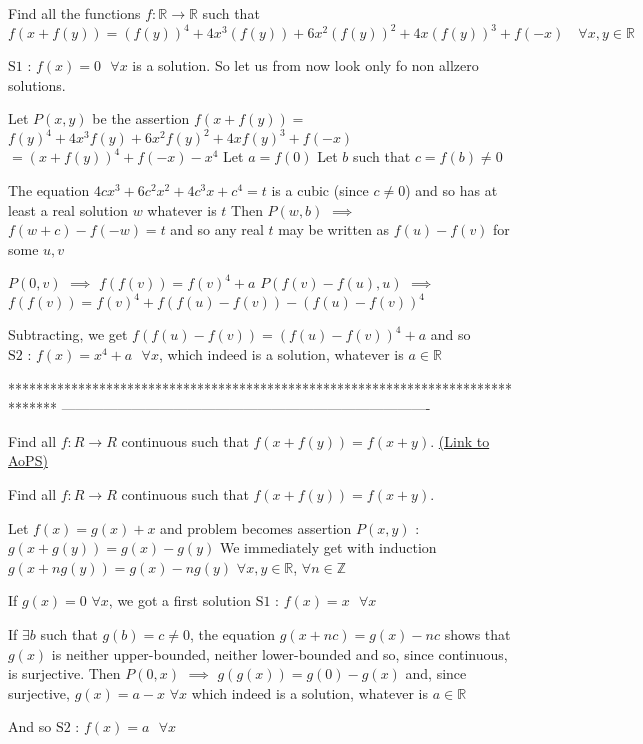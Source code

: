 \begin{solution}
	\begin{tcolorbox}Find all the functions $f:\mathbb{R}\to\mathbb{R}$ such that 
\[f(x+f(y))=(f(y))^4+4x^3(f(y))+6x^2(f(y))^2+4x(f(y))^3+f(-x) \quad \forall x,y \in\mathbb R\]\end{tcolorbox}
$\boxed{\text{S1 : }f(x)=0\text{  }\forall x}$ is a solution. So let us from now look only fo non allzero solutions.

Let $P(x,y)$ be the assertion $f(x+f(y))=$ $f(y)^4+4x^3f(y)+6x^2f(y)^2+4xf(y)^3+f(-x)$ $=(x+f(y))^4+f(-x)-x^4$
Let $a=f(0)$
Let $b$ such that $c=f(b)\ne 0$

The equation $4cx^3+6c^2x^2+4c^3x+c^4=t$ is a cubic (since $c\ne 0$) and so has at least a real solution $w$ whatever is $t$
Then $P(w,b)$ $\implies$ $f(w+c)-f(-w)=t$ and so any real $t$ may be written as $f(u)-f(v)$ for some $u,v$

$P(0,v)$ $\implies$ $f(f(v))=f(v)^4+a$
$P(f(v)-f(u),u)$ $\implies$ $f(f(v))=f(v)^4+f(f(u)-f(v))-(f(u)-f(v))^4$

Subtracting, we get $f(f(u)-f(v))=(f(u)-f(v))^4+a$ and so $\boxed{\text{S2 : }f(x)=x^4+a\text{   }\forall x}$, which indeed is a solution, whatever is $a\in\mathbb R$
\end{solution}
*******************************************************************************
-------------------------------------------------------------------------------

\begin{problem}
	Find all $f:R \rightarrow R$  continuous such that
$f(x+f(y))=f(x+y).$
	\flushright \href{https://artofproblemsolving.com/community/c6h586978}{(Link to AoPS)}
\end{problem}



\begin{solution}
	\begin{tcolorbox}Find all $f:R \rightarrow R$  continuous such that
$f(x+f(y))=f(x+y).$\end{tcolorbox}
Let $f(x)=g(x)+x$ and problem becomes assertion $P(x,y)$ : $g(x+g(y))=g(x)-g(y)$
We immediately get with induction $g(x+ng(y))=g(x)-ng(y)$ $\forall x,y\in\mathbb R$, $\forall n\in\mathbb Z$

If $g(x)=0$ $\forall x$, we got a first solution $\boxed{\text{S1 : }f(x)=x\text{   }\forall x}$

If $\exists b$ such that $g(b)=c\ne 0$, the equation $g(x+nc)=g(x)-nc$ shows that $g(x)$ is neither upper-bounded, neither lower-bounded and so, since continuous, is surjective.
Then $P(0,x)$ $\implies$ $g(g(x))=g(0)-g(x)$ and, since surjective, $g(x)=a-x$ $\forall x$ which indeed is a solution, whatever is $a\in\mathbb R$

And so $\boxed{\text{S2 : }f(x)=a\text{   }\forall x}$
\end{solution}



